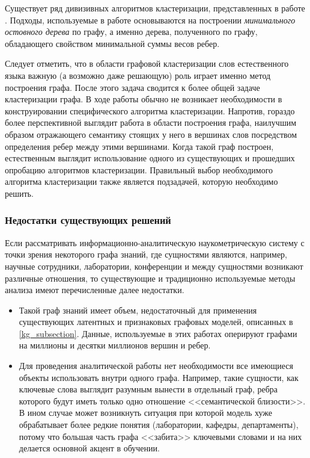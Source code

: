 Существует ряд дивизивных алгоритмов кластеризации,  представленных в работе \cite{clustering_mst}. Подходы, используемые в работе основываются на построении \emph{минимального остовного дерева} по графу, а именно дерева, полученного по графу, обладающего свойством минимальной суммы весов ребер.

Следует отметить, что в области графовой кластеризации слов естественного языка важную (а возможно даже решающую) роль играет именно метод построения графа. После этого задача сводится к более общей задаче кластеризации графа. В ходе работы обычно не возникает необходимости в конструировании специфического алгоритма кластеризации. Напротив, гораздо более перспективной выглядит работа в области построения графа, наилучшим образом отражающего семантику стоящих у него в вершинах слов посредством определения ребер между этими вершинами. Когда такой граф построен, естественным выглядит использование одного из существующих и прошедших опробацию алгоритмов кластеризации. Правильный выбор необходимого алгоритма кластеризации также является подзадачей, которую необходимо решить.

\subsubsection{Недостатки существующих решений}
Если рассматривать информационно-аналитическую наукометрическую систему с точки зрения некоторого графа знаний, где сущностями являются, например, научные сотрудники, лаборатории, конференции и между сущностями возникают различные отношения, то существующие и традиционно используемые методы анализа имеют перечисленные далее недостатки.
\begin{itemize}
    \item Такой граф знаний имеет объем, недостаточный для применения существующих латентных и признаковых графовых моделей, описанных в \ref{kg_subsection}. Данные, используемые в этих работах оперируют графами на миллионы и десятки миллионов вершин и ребер.
    \item Для проведения аналитической работы нет необходимости все имеющиеся объекты использовать внутри одного графа. Например, такие сущности, как ключевые слова выглядит разумным вынести в отдельный граф, ребра которого будут иметь только одно отношение <<семантической близости>>. В ином случае может возникнуть ситуация при которой модель хуже обрабатывает более редкие понятия (лаборатории, кафедры, департаменты), потому что большая часть графа <<забита>> ключевыми словами и на них делается основной акцент в обучении.
\end{itemize}

